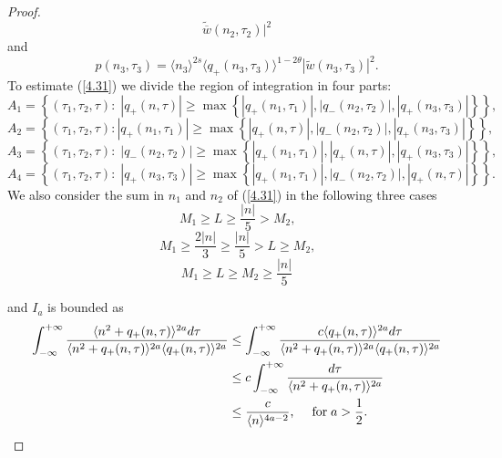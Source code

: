 \documentclass[reqno]{amsart}
\numberwithin{equation}{section}
\begin{document}
\begin{proof}
\[\widetilde{\overline{w}}(n_{2},\tau
_{2})| ^{2}\]
and
\begin{equation*}
p(n_3,\tau_3)=\langle n_3\rangle^{2s}\langle q_{+}(n_3,\tau_3)\rangle^{1-2\theta}
|\widetilde{w}(n_3,\tau_3)| ^{2}.
\end{equation*}
To estimate (\ref{4.31}) we divide the region of integration in four
parts:
\[
A_1=\left\{ \left(  \tau_{1},\tau_{2},\tau\right)  :\;| q_{+}(n,\tau)|
\geq\max\left\{| q_{+}(n_{1},\tau_{1})| ,
| q_{-}(n_{2},\tau_2)|, | q_{+}(n_3,\tau_3)|\right\}  \right\}
\text{,}
\]
\[
A_{2}=\left\{  \left(  \tau_{1},\tau_{2},\tau\right)  :| q_{+}(n_{1},\tau_{1})|
\geq\max\left\{|q_{+}(n,\tau )| , |q_{-}(n_{2},\tau_{2})| , |q_{+}(n_3,\tau_3)| \right\}
\right\},
\]\[
A_{3}=\left\{  \left(  \tau_{1},\tau_{2},\tau\right)  :\;| q_{-}(n_{2},\tau_{2})|
 \geq\max\left\{|q_{+}(n_{1},\tau _{1})| , |q_{+}(n,\tau)| ,| q_{+}(n_3,\tau_3)| \right\} \right\},
\]\[
A_{4}=\left\{  \left(  \tau_{1},\tau_{2},\tau\right)  :\;|q_{+}(n_3,\tau_3)|
\geq\max\left\{ | q_{+}(n_{1},\tau_{1})|
,| q_{-}(n_{2},\tau _{2})| , |q_{+}(n,\tau)| \right\}  \right\}.
\]
We also consider the sum in $n_{1}$ and $n_{2}$ of (\ref{4.31}) in the
following three cases
\begin{equation}\label{4.32}
M_{1}\geq L\geq\frac{| n| }{5}>M_{2}\text{,}
\end{equation}
\begin{equation}\label{4.33}
M_{1}\geq\frac{2| n| }{3}\geq\frac{|n|}{5}>L\geq M_{2}\text{,}
\end{equation}
\begin{equation}\label{4.34}
M_{1}\geq L\geq M_{2}\geq\frac{| n| }{5}
\end{equation}

and $I_{a}$ is bounded as
\begin{equation}\label{4.36}
\begin{split}
\int_{-\infty}^{+\infty}\frac{\langle
n^{2}+q_{+}(n,\tau)\rangle^{2a}d\tau }{\langle
n^{2}+q_{+}(n,\tau)\rangle^{2a}\langle q_{+}(n,\tau)\rangle^{2a}}
& \leq\int_{-\infty}^{+\infty}\frac{c\langle
q_{+}(n,\tau)\rangle^{2a}d\tau
}{\langle n^{2}+q_{+}(n,\tau)\rangle^{2a}\langle q_{+}(n,\tau)\rangle^{2a}}\\
&  \leq c\int_{-\infty}^{+\infty}\frac{d\tau}{\langle n^{2}+q_{+}(n,\tau)\rangle^{2a}}\\
&  \leq\frac{c}{\langle n\rangle^{4a-2}}\text{,\;\;\;\;
for}\;a>\frac{1}{2}.
\end{split}
\end{equation}


\end{proof}
\end{document}

